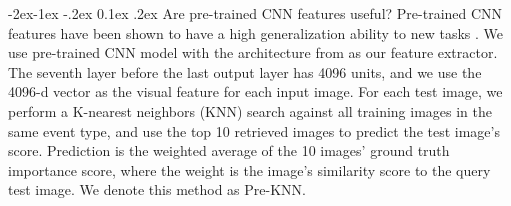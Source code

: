 \documentclass[10pt,twocolumn,letterpaper]{article}
\makeatletter
\renewcommand\subsubsection{\@startsection{subsubsection}{3}{\z@}%
                {-2ex\@plus -1ex \@minus -.2ex}%
                {0.1ex \@plus .2ex}%
                {\normalfont\normalsize\bfseries}}
\makeatother
\begin{document}



\subsubsection{Are pre-trained CNN features useful?}
Pre-trained CNN features have been shown to have a high generalization ability to new tasks \cite{devil, rcnn}. We use pre-trained CNN model \cite{caffe} with the architecture from \cite{imagenet} as our feature extractor. The seventh layer before the last output layer has 4096 units, and we use the 4096-d vector as the visual feature for each input image. For each test image, we perform a K-nearest neighbors (KNN) search against all training images in the same event type, and use the top 10 retrieved images to predict the test image's score. Prediction is the weighted average of the 10 images' ground truth importance score, where the weight is the image's similarity score to the query test image. We denote this method as Pre-KNN.
\end{document}

